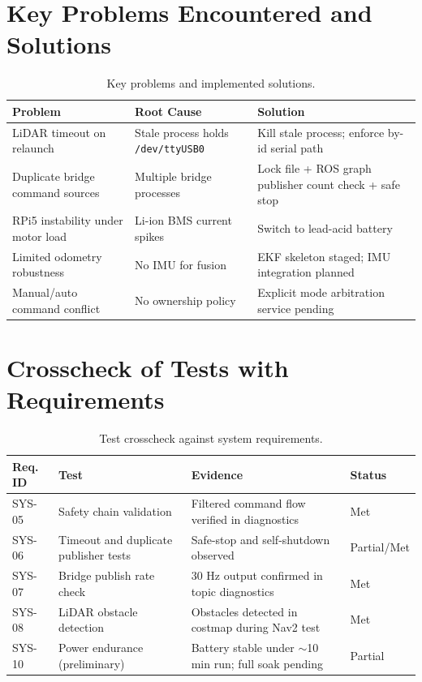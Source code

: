 \documentclass[12pt,a4paper]{report}
\begin{document}
\section{Key Problems Encountered and Solutions}

\begin{table}[H]
\centering
\caption{Key problems and implemented solutions.}
\label{tab:problems}
\begin{tabularx}{\textwidth}{|p{3.3cm}|p{3cm}|X|}
\hline
\textbf{Problem} & \textbf{Root Cause} & \textbf{Solution} \\
\hline
LiDAR timeout on relaunch & Stale process holds \texttt{/dev/ttyUSB0} & Kill stale process; enforce by-id serial path \\
\hline
Duplicate bridge command sources & Multiple bridge processes & Lock file + ROS graph publisher count check + safe stop \\
\hline
RPi5 instability under motor load & Li-ion BMS current spikes & Switch to lead-acid battery \\
\hline
Limited odometry robustness & No IMU for fusion & EKF skeleton staged; IMU integration planned \\
\hline
Manual/auto command conflict & No ownership policy & Explicit mode arbitration service pending \\
\hline
\end{tabularx}
\end{table}

\section{Crosscheck of Tests with Requirements}

\begin{table}[H]
\centering
\caption{Test crosscheck against system requirements.}
\label{tab:test_crosscheck}
\begin{tabularx}{\textwidth}{|p{2cm}|p{3.5cm}|X|p{1.8cm}|}
\hline
\textbf{Req. ID} & \textbf{Test} & \textbf{Evidence} & \textbf{Status} \\
\hline
SYS-05 & Safety chain validation & Filtered command flow verified in diagnostics & Met \\
\hline
SYS-06 & Timeout and duplicate publisher tests & Safe-stop and self-shutdown observed & Partial/Met \\
\hline
SYS-07 & Bridge publish rate check & 30 Hz output confirmed in topic diagnostics & Met \\
\hline
SYS-08 & LiDAR obstacle detection & Obstacles detected in costmap during Nav2 test & Met \\
\hline
SYS-10 & Power endurance (preliminary) & Battery stable under $\sim$10 min run; full soak pending & Partial \\
\hline
\end{tabularx}
\end{table}
\end{document}

